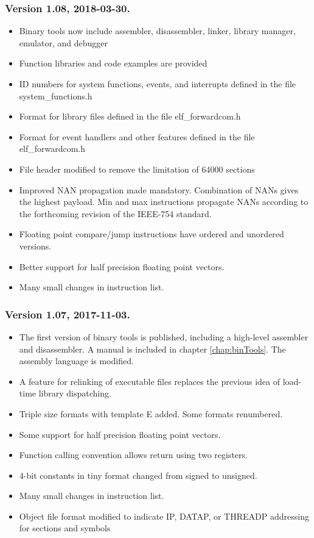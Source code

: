 \documentclass[forwardcom.tex]{subfiles}
\begin{document}
\subsubsection{Version 1.08, 2018-03-30.}
\begin{itemize}

\item Binary tools now include assembler, disassembler, linker, library manager, emulator, and debugger
\item Function libraries and code examples are provided
\item ID numbers for system functions, events, and interrupts defined in the file system\_functions.h
\item Format for library files defined in the file elf\_forwardcom.h
\item Format for event handlers and other features defined in the file elf\_forwardcom.h
\item File header modified to remove the limitation of 64000 sections
\item Improved NAN propagation made mandatory. Combination of NANs gives the highest payload. 
Min and max instructions propagate NANs according to the forthcoming revision of the IEEE-754 standard.
\item Floating point compare/jump instructions have ordered and unordered versions.
\item Better support for half precision floating point vectors.
\item Many small changes in instruction list. 
\end{itemize}


\subsubsection{Version 1.07, 2017-11-03.}
\begin{itemize}
\item The first version of binary tools is published, including a high-level assembler and disassembler. A manual is included in chapter \ref{chap:binTools}. The assembly language is modified.
\item A feature for relinking of executable files replaces the previous idea of load-time library dispatching.
\item Triple size formats with template E added. Some formats renumbered.
\item Some support for half precision floating point vectors.
\item Function calling convention allows return using two registers.
\item 4-bit constants in tiny format changed from signed to unsigned.
\item Many small changes in instruction list.
\item Object file format modified to indicate IP, DATAP, or THREADP addressing for sections and symbols
\end{itemize}
\end{document}
